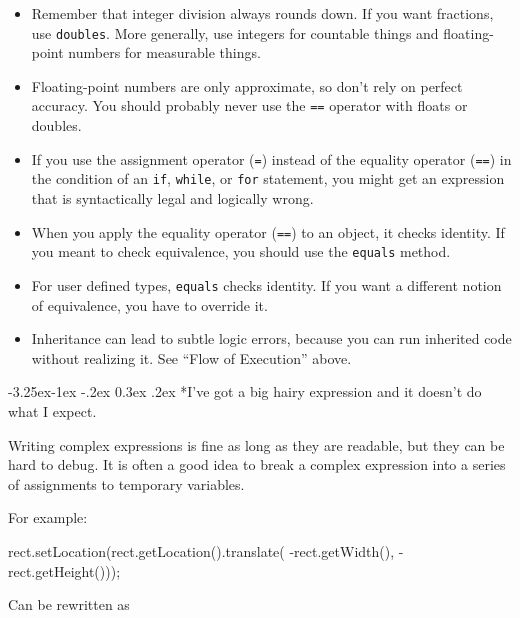 \documentclass[12pt]{book}
\makeatletter
\theoremstyle{exercise}
\renewcommand\subsection{\@startsection{subsection}{2}{\z@}%
    {-3.25ex\@plus -1ex \@minus -.2ex}%
    {0.3ex \@plus .2ex}%
    {\normalfont\large\bfseries}}
\makeatother
\begin{document}
\begin{itemize}

\item Remember that integer division always rounds down.  If you want fractions, use {\tt doubles}.
More generally, use integers for countable things and floating-point numbers for measurable things.

\item Floating-point numbers are only approximate, so don't rely on perfect accuracy.
You should probably never use the {\tt ==} operator with floats or doubles.

\item If you use the assignment operator ({\tt =}) instead of the equality operator ({\tt ==}) in the condition of an {\tt if}, {\tt while}, or {\tt for} statement, you might get an expression that is syntactically legal and logically wrong.

\item When you apply the equality operator ({\tt ==}) to an object, it checks identity.
If you meant to check equivalence, you should use the {\tt equals} method.

\item For user defined types, {\tt equals} checks identity.
If you want a different notion of equivalence, you have to
override it.

\item Inheritance can lead to subtle logic errors, because you can run inherited code without realizing it.  See ``Flow of Execution'' above.

\end{itemize}


\subsection*{I've got a big hairy expression and it doesn't
do what I expect.}

Writing complex expressions is fine as long as they are readable, but they can be hard to debug.
It is often a good idea to break a complex expression into a series of assignments to temporary variables.

For example:

\begin{code}
rect.setLocation(rect.getLocation().translate(
                -rect.getWidth(), -rect.getHeight()));
\end{code}

Can be rewritten as
\end{document}
